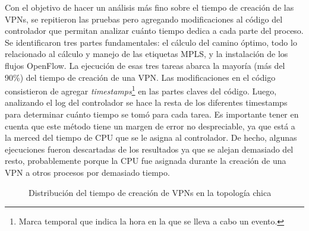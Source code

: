 Con el objetivo de hacer un análisis más fino sobre el tiempo de creación de las VPNs, se repitieron las pruebas pero agregando modificaciones al código del controlador que permitan analizar cuánto tiempo dedica a cada parte del proceso. Se identificaron tres partes fundamentales: el cálculo del camino óptimo, todo lo relacionado al cálculo y manejo de las etiquetas MPLS, y la instalación de los flujos OpenFlow. La ejecución de esas tres tareas abarca la mayoría (más del 90\%) del tiempo de creación de una VPN. Las modificaciones en el código consistieron de agregar \textit{timestamps}\footnote{Marca temporal que indica la hora en la que se lleva a cabo un evento.} en las partes claves del código. Luego, analizando el log del controlador se hace la resta de los diferentes timestamps para determinar cuánto tiempo se tomó para cada tarea. Es importante tener en cuenta que este método tiene un margen de error no despreciable, ya que está a la merced del tiempo de CPU que se le asigna al controlador. De hecho, algunas ejecuciones fueron descartadas de los resultados ya que se alejan demasiado del resto, probablemente porque la CPU fue asignada durante la creación de una VPN a otros procesos por demasiado tiempo.

\begin{figure}[h]
	\caption{Distribución del tiempo de creación de VPNs en la topología chica}
	\centering
	\label{fig:gráfica_tiempo_chica}
\end{figure}

